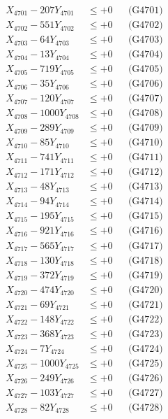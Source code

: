 \documentclass[a4paper,10pt]{article}
\begin{document}
{\begin{align}
\allowbreak
X_{4701} - 207Y_{4701} &\leq +0 && \text{(G4701)} \\
X_{4702} - 551Y_{4702} &\leq +0 && \text{(G4702)} \\
X_{4703} - 64Y_{4703} &\leq +0 && \text{(G4703)} \\
X_{4704} - 13Y_{4704} &\leq +0 && \text{(G4704)} \\
X_{4705} - 719Y_{4705} &\leq +0 && \text{(G4705)} \\
X_{4706} - 35Y_{4706} &\leq +0 && \text{(G4706)} \\
X_{4707} - 120Y_{4707} &\leq +0 && \text{(G4707)} \\
X_{4708} - 1000Y_{4708} &\leq +0 && \text{(G4708)} \\
X_{4709} - 289Y_{4709} &\leq +0 && \text{(G4709)} \\
X_{4710} - 85Y_{4710} &\leq +0 && \text{(G4710)} \\
\allowbreak
X_{4711} - 741Y_{4711} &\leq +0 && \text{(G4711)} \\
X_{4712} - 171Y_{4712} &\leq +0 && \text{(G4712)} \\
X_{4713} - 48Y_{4713} &\leq +0 && \text{(G4713)} \\
X_{4714} - 94Y_{4714} &\leq +0 && \text{(G4714)} \\
X_{4715} - 195Y_{4715} &\leq +0 && \text{(G4715)} \\
X_{4716} - 921Y_{4716} &\leq +0 && \text{(G4716)} \\
X_{4717} - 565Y_{4717} &\leq +0 && \text{(G4717)} \\
X_{4718} - 130Y_{4718} &\leq +0 && \text{(G4718)} \\
X_{4719} - 372Y_{4719} &\leq +0 && \text{(G4719)} \\
X_{4720} - 474Y_{4720} &\leq +0 && \text{(G4720)} \\
\allowbreak
X_{4721} - 69Y_{4721} &\leq +0 && \text{(G4721)} \\
X_{4722} - 148Y_{4722} &\leq +0 && \text{(G4722)} \\
X_{4723} - 368Y_{4723} &\leq +0 && \text{(G4723)} \\
X_{4724} - 7Y_{4724} &\leq +0 && \text{(G4724)} \\
X_{4725} - 1000Y_{4725} &\leq +0 && \text{(G4725)} \\
X_{4726} - 249Y_{4726} &\leq +0 && \text{(G4726)} \\
X_{4727} - 103Y_{4727} &\leq +0 && \text{(G4727)} \\
X_{4728} - 82Y_{4728} &\leq +0 && \text{(G4728)} \\

\end{align}}
\end{document}
